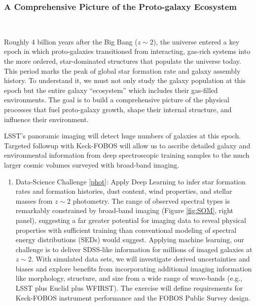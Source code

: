 \documentclass[oneside,11pt]{amsart}
\newcounter{chalno}
\newcommand{\chal}[1]{\refstepcounter{chalno}\label{#1}}
\begin{document}
\subsubsection{A Comprehensive Picture of the Proto-galaxy Ecosystem}
\label{sec:galaxies}
~\medskip

Roughly 4 billion years after the Big Bang ($z \sim 2$), the universe
entered a key epoch in which proto-galaxies transitioned from
interacting, gas-rich systems into the more ordered, star-dominated
structures that populate the universe today.  This period marks the peak
of global star formation rate and galaxy assembly history.   To
understand it, we must not only study the galaxy population at this
epoch but the entire galaxy ``ecosystem'' which includes their
gas-filled environments.  The goal is to build a comprehensive picture
of the physical processes that fuel proto-galaxy growth, shape their
internal structure, and influence their environment.

LSST's panoramic imaging will detect huge numbers of galaxies at this
epoch.  Targeted followup with Keck-FOBOS will allow us to ascribe
detailed galaxy and environmental information from deep spectroscopic
training samples to the much larger cosmic volumes surveyed with
broad-band imaging.


\begin{enumerate}[rightmargin=0.2cm,leftmargin=0.2cm]

\chal{phot}
\item[] {\textsf {\large Data-Science Challenge \ref{phot}: Apply Deep Learning to
infer star formation rates and formation histories, dust content, wind
properties, and stellar masses from $z \sim 2$ photometry}}.  The range
of observed spectral types is remarkably constrained by broad-band
imaging (Figure \ref{fig:SOM}, right panel), suggesting a far greater
potential for imaging data to reveal physical properties with sufficient
training than conventional modeling of spectral energy distributions
(SEDs) would suggest.  Applying machine learning, our challenge is to
deliver SDSS-like information for millions of imaged galaxies at $z \sim
2$.  With simulated data sets, we will investigate derived uncertainties
and biases and explore benefits from incorporating additional imaging
information like morphology, structure, and size from a wide range of
wave-bands (e.g., LSST plus Euclid plus WFIRST).  The exercise will
define requirements for Keck-FOBOS instrument performance and the FOBOS
Public Survey design.

\end{enumerate}
\end{document}
